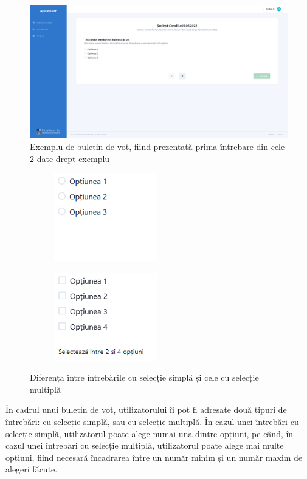 \begin{figure}[!ht]
    \centering
    \includegraphics[width=145mm]{images/page_vote.png}
    \caption{Exemplu de buletin de vot, fiind prezentată prima întrebare din cele 2 date drept exemplu}
\end{figure}

\begin{figure}
\centering
\begin{subfigure}{.5\textwidth}
    \centering
    \includegraphics[width=45mm]{images/single_select.png}
\end{subfigure}%
\begin{subfigure}{.5\textwidth}
    \centering
    \includegraphics[width=45mm]{images/multiple_select.png}
\end{subfigure}
    \caption{Diferența între întrebările cu selecție simplă și cele cu selecție multiplă}
\end{figure}

În cadrul unui buletin de vot, utilizatorului îi pot fi adresate două tipuri de întrebări: cu selecție simplă, sau cu selecție multiplă. În cazul unei întrebări cu selecție simplă, utilizatorul poate alege numai una dintre opțiuni, pe când, în cazul unei întrebări cu selecție multiplă, utilizatorul poate alege mai multe opțiuni, fiind necesară încadrarea între un număr minim și un număr maxim de alegeri făcute.

